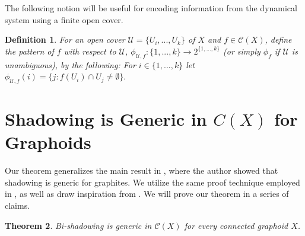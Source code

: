 \documentclass[10pt,a4paper]{amsart}
\newtheorem{theorem}{Theorem}[section]
\newtheorem{definition}[theorem]{Definition}
\numberwithin{equation}{section}
\begin{document}
The following notion will be useful for encoding information from the dynamical system using a finite open cover.

\begin{definition}
    For an open cover $\mathcal{U}=\{U_i,...,U_k\}$ of $X$ and $f\in \mathcal C(X)$, define \emph{the pattern of $f$ with respect to $\mathcal{U}$}, $\phi_{\mathcal{U},f}:\{1,...,k\}\to 2^{\{1,...,k\}} $ (or simply $\phi_f$ if $\mathcal{U}$ is unambiguous), by the following: For $i\in\{1,...,k\}$ let $\phi_{\mathcal{U},f}(i)= \{j:f(U_i)\cap U_j\neq \emptyset\}.$
\end{definition}




\section{Shadowing is Generic in $C(X)$ for Graphoids} \label{sec: Main}



Our theorem generalizes the main result in \cite{genericshadowingmeddaugh}, where the author showed that shadowing is generic for graphites. We utilize the same proof technique employed in \cite{genericshadowingmeddaugh}, as well as draw inspiration from \cite{bishadowgenericoprocha}. We will prove our theorem in a series of claims.


\begin{theorem}
    Bi-shadowing is generic in $\mathcal C(X)$ for every connected graphoid $X$. %
\end{theorem}
\end{document}
